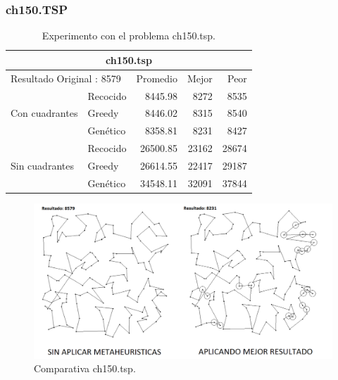 \subsubsection{ch150.TSP}
\begin{table}[hbtp]
 \centering	
    \caption{Experimento con el problema ch150.tsp.} 
	\begin{tabular}{ | l   l | r | r | r |   }
         \hline\multicolumn{5}{|c|}{ \rowcolor[gray]{0.8} ch150.tsp } \\\hline
         \multicolumn{2}{|l|}{Resultado Original : 8579}   & Promedio & Mejor & Peor \\ 
                \hline
                & Recocido  &  8445.98 & 8272 & 8535  \\ 
 Con cuadrantes & Greedy    &  8446.02 & 8315 & 8540  \\ 
                & Genético  & \cellcolor[gray]{0.9}8358.81 & \cellcolor[gray]{0.9}8231 & \cellcolor[gray]{0.9}8427 \\ 
                \hline
                & Recocido  & \cellcolor[gray]{0.9} 26500.85 & 23162 & \cellcolor[gray]{0.9} 28674 \\ 
 Sin cuadrantes & Greedy    &  26614.55 & \cellcolor[gray]{0.9} 22417 & 29187 \\ 
                & Genético  &  34548.11 & 32091 & 37844 \\ 
                \hline
    \end{tabular}
    \label{table:EXP_ch150.tsp}
\end{table}
\begin{figure}[hbtp]
    \centering
        \includegraphics[width=1\textwidth]{PruebasResultados/Experimentos_Comparativas/ch150.png}
        \caption{Comparativa ch150.tsp.}
        \label{fig:ch150_comparativa.png}
\end{figure}
